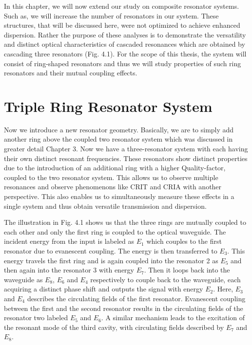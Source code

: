 In this chapter, we will now extend our study on composite resonator systems. Such as, we will increase the number of resonators in our system. These structures, that will be discussed here, were not optimized to achieve enhanced dispersion. Rather the purpose of these analyses is to demonstrate the versatility and distinct optical characteristics of cascaded resonances which are obtained by cascading three resonators (Fig. 4.1). For the scope of this thesis, the system will consist of ring-shaped resonators and thus we will study properties of such ring resonators and their mutual coupling effects.
\section{Triple Ring Resonator System}
Now we introduce a new resonator geometry. Basically, we are to simply add another ring above the coupled two resonator system which was discussed in greater detail Chapter 3. Now we have a three-resonator system with each having their own distinct resonant frequencies. These resonators show distinct properties due to the introduction of an additional ring with a higher Quality-factor, coupled to the two resonator system. This allows us to observe multiple resonances and observe phenomenons like CRIT and CRIA with another perspective. This also enables us to simultaneously measure these effects in a single system and thus obtain versatile transmission and dispersion.

The illustration in Fig. 4.1 shows us that the three rings are mutually coupled to each other and only the first ring is coupled to the optical waveguide. The incident energy from the input is labeled as $E_{1}$ which couples to the first resonator due to evanescent coupling. The energy is then transferred to $E_{3}$. This energy travels the first ring and is again coupled into the resonator 2 as $E_{5}$ and then again into the resonator 3 with energy $E_{7}$. Then it loops back into the waveguide as $E_{8}$, $E_{6}$ and $E_{4}$ respectively to couple back to the waveguide, each acquiring a distinct phase shift and outputs the signal with energy $E_{2}$. Here, $E_{3}$ and $E_{4}$ describes the circulating fields of the first resonator. Evanescent coupling between the first and the second resonator results in the circulating fields of the resonator two labeled $E_{5}$ and $E_{6}$. A similar mechanism leads to the excitation of the resonant mode of the third cavity, with circulating fields described by $E_{7}$ and $E_{8}$.

